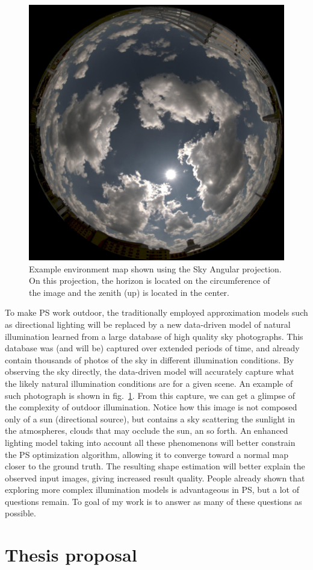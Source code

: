 \begin{figure}
\centering
\includegraphics[width=0.5\linewidth]{./figures/database/example.jpg}
\caption{Example environment map shown using the Sky Angular projection. On this projection, the horizon is located on the circumference of the image and the zenith (up) is located in the center.}
\label{fig:envmap_example}
\end{figure}


To make PS work outdoor, the traditionally employed approximation models such as directional lighting will be replaced by a new data-driven model of natural illumination learned from a large database of high quality sky photographs. This database was (and will be) captured over extended periods of time, and already contain thousands of photos of the sky in different illumination conditions. By observing the sky directly, the data-driven model will accurately capture what the likely natural illumination conditions are for a given scene. An example of such photograph is shown in fig.~\ref{fig:envmap_example}. From this capture, we can get a glimpse of the complexity of outdoor illumination. Notice how this image is not composed only of a sun (directional source), but contains a sky scattering the sunlight in the atmospheres, clouds that may occlude the sun, an so forth. An enhanced lighting model taking into account all these phenomenons will better constrain the PS optimization algorithm, allowing it to converge toward a normal map closer to the ground truth. The resulting shape estimation will better explain the observed input images, giving increased result quality. People already shown that exploring more complex illumination models is advantageous in PS, but a lot of questions remain. To goal of my work is to answer as many of these questions as possible.


\section{Thesis proposal}

